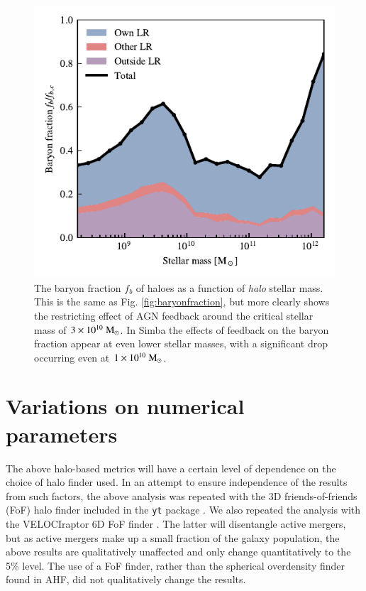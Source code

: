 \documentclass[fleqn,usenatbib]{mnras}
\newcommand{\msolar}{\;{\rm M}_{\odot}}
\newcommand{\simba}{{\sc Simba}}
\newcommand{\velociraptor}{{\sc VELOCIraptor}}
\begin{document}
\begin{figure}
	\centering
	\includegraphics{figures/s50j7kAHF/baryon_fraction_breakdown_stellar.pdf}
	\vspace{-0.7cm}
	\caption{The baryon fraction $f_b$ of haloes as a function of \emph{halo}
	stellar mass. This is the same as Fig. \ref{fig:baryonfraction}, but more
	clearly shows the restricting effect of AGN feedback around the critical
	stellar mass of $3\times10^{10}\msolar{}$. In \simba{} the effects of
	feedback on the baryon fraction appear at even lower stellar masses,
	with a significant drop occurring even at $1\times10^{10}\msolar{}$.}
	\label{fig:baryonfractionstellar}
\end{figure} \section{Variations on numerical parameters}
\label{sec:convergence}

The above halo-based metrics will have a certain level of dependence on the
choice of halo finder used. In an attempt to ensure independence of the
results from such factors, the above analysis was repeated  with the 3D
friends-of-friends (FoF) halo finder included in the {\tt yt} package
\citep{Turk2011}. We also repeated the analysis with the \velociraptor{} 6D
FoF finder \citep{Elahi2019}. The latter will disentangle active mergers, but
as active mergers make up a small fraction of the galaxy population, the
above results are qualitatively unaffected and only change quantitatively
to the 5\% level. The use of a FoF finder, rather than the spherical
overdensity finder found in AHF, did not qualitatively change the results.
\end{document}
